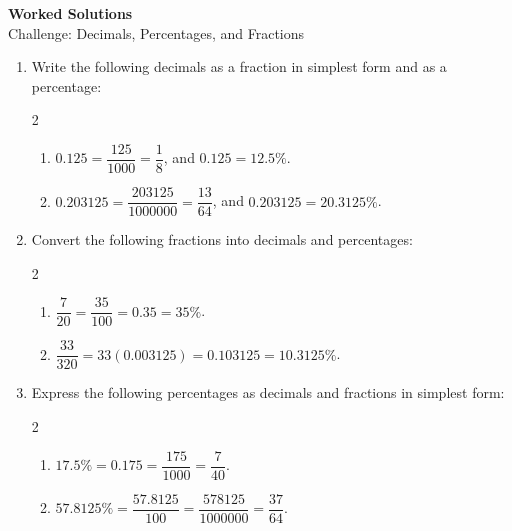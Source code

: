 \documentclass[12pt]{article}
\begin{document}

\begin{center}
{\LARGE\bfseries Worked Solutions}\\[0.3em]
{\large Challenge: Decimals, Percentages, and Fractions}
\end{center}
\vspace{0.5em}

\begin{enumerate}[label=\textbf{Q\arabic*.}]

\item Write the following decimals as a fraction in simplest form and as a percentage:
\begin{multicols}{2}
\begin{enumerate}[label=(\alph*)]
\item 
\(0.125=\dfrac{125}{1000}=\dfrac{1}{8}\), and
\(0.125=12.5\%\).

\item 
\(0.203125=\dfrac{203125}{1000000}=\dfrac{13}{64}\), and
\(0.203125=20.3125\%\).
\end{enumerate}
\end{multicols}

\item Convert the following fractions into decimals and percentages:
\begin{multicols}{2}
\begin{enumerate}[label=(\alph*)]
\item 
\(\dfrac{7}{20}=\dfrac{35}{100}=0.35=35\%\).

\item 
\(\dfrac{33}{320}=33(0.003125)=0.103125=10.3125\%\).
\end{enumerate}
\end{multicols}

\item Express the following percentages as decimals and fractions in simplest form:
\begin{multicols}{2}
\begin{enumerate}[label=(\alph*)]
\item 
\(17.5\%=0.175=\dfrac{175}{1000}=\dfrac{7}{40}\).

\item 
\(57.8125\%=\dfrac{57.8125}{100}=\dfrac{578125}{1000000}=\dfrac{37}{64}\).
\end{enumerate}
\end{multicols}

\end{enumerate}
\end{document}
